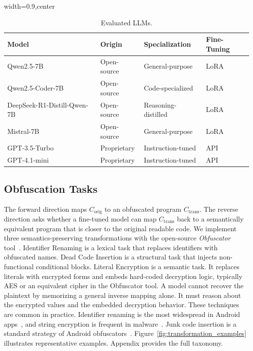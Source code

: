 \begin{table}[h]
\centering
\caption{Evaluated LLMs.}
\label{tab:models}
\begin{adjustbox}{width=0.9\columnwidth,center}
\begin{tabular}{@{}llll@{}}
\toprule
\textbf{Model} & \textbf{Origin} & \textbf{Specialization} & \textbf{Fine-Tuning} \\ \midrule
Qwen2.5-7B~\cite{qwen2} & Open-source & General-purpose & LoRA \\
Qwen2.5-Coder-7B~\cite{qwen2coder} & Open-source & Code-specialized & LoRA \\
DeepSeek-R1-Distill-Qwen-7B~\cite{deepseek} & Open-source & Reasoning-distilled & LoRA \\
Mistral-7B~\cite{mistral} & Open-source & General-purpose & LoRA \\
GPT-3.5-Turbo~\cite{openai2023gpt35} & Proprietary & Instruction-tuned & API \\
GPT-4.1-mini~\cite{openai2025gpt41mini} & Proprietary & Instruction-tuned & API \\ \bottomrule
\end{tabular}
\end{adjustbox}
\end{table}

\subsection{Obfuscation Tasks}
\label{sec:framework_instantiation}

The forward direction maps $C_{\text{orig}}$ to an obfuscated program
$C_{\text{trans}}$. The reverse direction asks whether a fine-tuned model can
map $C_{\text{trans}}$ back to a semantically equivalent program that is closer
to the original readable code. We implement three semantics-preserving
transformations with the open-source \emph{Obfuscator}
tool~\cite{superblaubeere27obfuscator}. Identifier Renaming is a lexical task
that replaces identifiers with obfuscated names. Dead Code Insertion is a
structural task that injects non-functional conditional blocks. Literal
Encryption is a semantic task.
It replaces literals with encrypted forms and embeds hard-coded decryption
logic, typically AES or an equivalent cipher in the Obfuscator tool.
A model cannot recover the plaintext by memorizing a general inverse mapping
alone. It must reason about the encrypted values and the embedded decryption
behavior.
These techniques are common in practice.
Identifier renaming is the most widespread in Android apps~\cite{dong2018android}, and string encryption is frequent in malware~\cite{dong2018android}.
Junk code insertion is a standard strategy of Android obfuscators~\cite{hammad2018obfuscation}.
Figure~\ref{fig:transformation_examples} %
illustrates representative examples. Appendix provides the full taxonomy.

